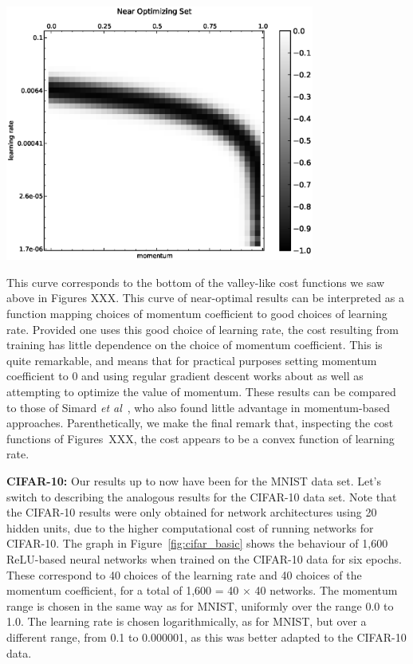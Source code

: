 \documentclass[10pt]{article}
\begin{document}
\begin{center}
\includegraphics[width=4in]{plots/detailed/OptimalCorrect.eps}
\end{center}
%
This curve corresponds to the bottom of the valley-like cost functions
we saw above in Figures XXX.  This curve of near-optimal results can
be interpreted as a function mapping choices of momentum coefficient
to good choices of learning rate. Provided one uses this good choice
of learning rate, the cost resulting from training has little
dependence on the choice of momentum coefficient.  This is quite
remarkable, and means that for practical purposes setting momentum
coefficient to 0 and using regular gradient descent works about as
well as attempting to optimize the value of momentum.  These results
can be compared to those of Simard \emph{et al}~\cite{Simard2003a},
who also found little advantage in momentum-based approaches.
Parenthetically, we make the final remark that, inspecting the cost
functions of Figures~XXX, the cost appears to be a convex function of
learning rate.

%
%
\textbf{CIFAR-10:} Our results up to now have been for the MNIST data
set.  Let's switch to describing the analogous results for the
CIFAR-10 data set.  Note that the CIFAR-10 results were only obtained
for network architectures using 20 hidden units, due to the higher
computational cost of running networks for CIFAR-10.  The graph in
Figure~\ref{fig:cifar_basic} shows the behaviour of 1,600 ReLU-based
neural networks when trained on the CIFAR-10 data for six
epochs. These correspond to 40 choices of the learning rate and 40
choices of the momentum coefficient, for a total of 1,600 = 40
$\times$ 40 networks.  The momentum range is chosen in the same way as
for MNIST, uniformly over the range 0.0 to 1.0.  The learning rate is
chosen logarithmically, as for MNIST, but over a different range, from
0.1 to 0.000001, as this was better adapted to the CIFAR-10 data.
\end{document}
